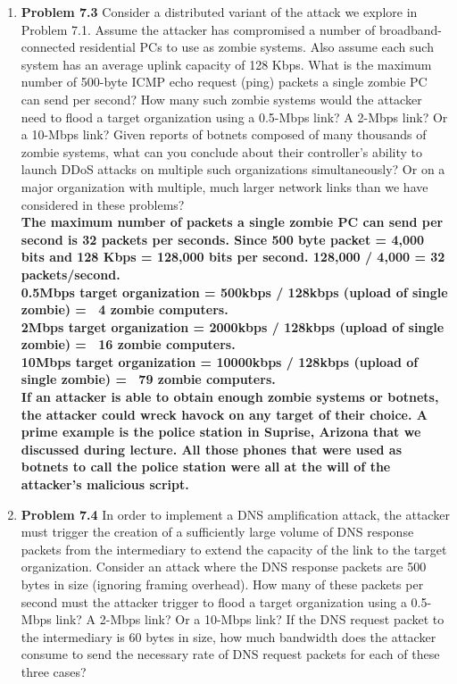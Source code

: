 \documentclass[12pt]{article}
\begin{document}
\begin{enumerate}
\item \textbf{Problem 7.3} Consider a distributed variant of the attack we explore in Problem 7.1. Assume the attacker has compromised a number of broadband-connected residential PCs to use as zombie systems. Also assume each such system has an average uplink capacity of 128 Kbps. What is the maximum number of 500-byte ICMP echo request (ping) packets a single zombie PC can send per second? How many such zombie systems would the attacker need to flood a target organization using a 0.5-Mbps link? A 2-Mbps link? Or a 10-Mbps link? Given reports of botnets composed of many thousands of zombie systems, what can you conclude about their controller’s ability to launch DDoS attacks on multiple such organizations simultaneously? Or on a major organization with multiple, much larger network links than we have considered in these problems? \\

\textbf{The maximum number of packets a single zombie PC can send per second is 32 packets per seconds. Since 500 byte packet = 4,000 bits and 128 Kbps = 128,000 bits per second. 128,000 / 4,000 = 32 packets/second.} \\

\textbf{0.5Mbps target organization = 500kbps / 128kbps (upload of single zombie) = ~4 zombie computers.} \\

\textbf{2Mbps target organization = 2000kbps / 128kbps (upload of single zombie) = ~16 zombie computers.} \\

\textbf{10Mbps target organization = 10000kbps / 128kbps (upload of single zombie) = ~79 zombie computers.} \\

\textbf{If an attacker is able to obtain enough zombie systems or botnets, the attacker could wreck havock on any target of their choice. A prime example is the police station in Suprise, Arizona that we discussed during lecture. All those phones that were used as botnets to call the police station were all at the will of the attacker's malicious script. }

\item \textbf{Problem 7.4} In order to implement a DNS amplification attack, the attacker must trigger the creation of a sufficiently large volume of DNS response packets from the intermediary to extend the capacity of the link to the target organization. Consider an attack where the DNS response packets are 500 bytes in size (ignoring framing overhead). How many of these packets per second must the attacker trigger to flood a target organization using a 0.5-Mbps link? A 2-Mbps link? Or a 10-Mbps link? If the DNS request packet to the intermediary is 60 bytes in size, how much bandwidth does the attacker consume to send the necessary rate of DNS request packets for each of these three cases? \\


\end{enumerate}
\end{document}
